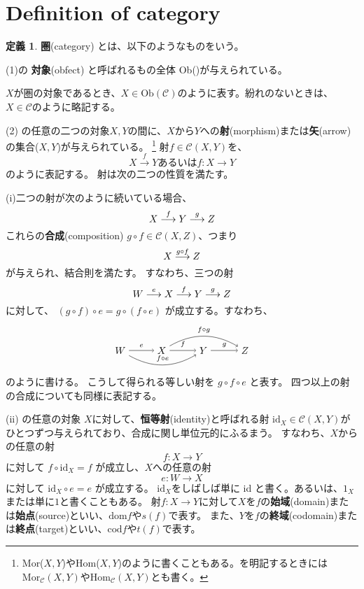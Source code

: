 \documentclass[dvipdfmx]{jsbook}
\theoremstyle{definition}
\newtheorem{dfn}{定義}[section]
\begin{document}
\section{Definition of category}
\begin{dfn}
\textbf{圏}(category) \category とは、以下のようなものをいう。
\end{dfn}
(1)\category の \textbf{対象}(obfect) と呼ばれるもの全体 Ob(\category)が与えられている。

$X$が圏\category の対象であるとき、$X \in \mathrm{Ob}(\mathscr{C})$のように表す。紛れのないときは、$X \in \mathscr{C}$のように略記する。

(2) \category の任意の二つの対象$X,Y$の間に、$X$から$Y$への\textbf{射}(morphism)または\textbf{矢}(arrow)の集合\category ($X,Y$)が与えられている。
\footnote{Mor($X,Y$)やHom($X,Y$)のように書くこともある。\category を明記するときには $\mathrm{Mor}_{\mathscr{C}} (X,Y) や  \mathrm{Hom}_{\mathscr{C}} (X,Y)$とも書く。}
射$f \in \mathscr{C}(X,Y)$を、
\[
X \overset{f}{\longrightarrow} Y
あるいは
f \colon X \longrightarrow Y
\]
のように表記する。
射は次の二つの性質を満たす。

(i)二つの射が次のように続いている場合、
\[
X \overset{f}{\longrightarrow} Y \overset{g}{\longrightarrow} Z
\]
これらの\textbf{合成}(composition)
$g \circ f \in \mathscr{C} (X,Z)$、つまり
\[ X \overset{g \circ f}{\longrightarrow} Z \]
が与えられ、結合則を満たす。
すなわち、三つの射
\[
W \overset{e}{\longrightarrow} X \overset{f}{\longrightarrow} Y \overset{g}{\longrightarrow} Z
\]
に対して、
$(g \circ f) \circ e = g \circ (f \circ e)$
が成立する。すなわち、
\[
\begin{tikzpicture}[auto]
\node (w) at (0,0) {$W$}; \node (x) at (1.5,0) {$X$};
\node (y) at (3.0,0) {$Y$}; \node (z) at (4.5,0) {$Z$};
\draw[-to] (w) to node {$\scriptstyle e$} (x);
\draw[-to] (x) to node {$\scriptstyle f$} (y);
\draw[-to] (y) to node {$\scriptstyle g$} (z);
\draw[-to,bend left] (x) to node {$\scriptstyle f \circ g$} (z);
\draw[-to,bend right] (w) to node {$\scriptstyle f \circ e $} (y);
\end{tikzpicture}
\]
のように書ける。
こうして得られる等しい射を
$g \circ f \circ e$
と表す。
四つ以上の射の合成についても同様に表記する。

(ii) \category の任意の対象 $X$に対して、\textbf{恒等射}(identity)と呼ばれる射 $\mathrm{id}_X \in \mathscr{C} (X,Y)$がひとつずつ与えられており、合成に関し単位元的にふるまう。
すなわち、$X$からの任意の射
\[f \colon X \longrightarrow Y \]
に対して
$f \circ \mathrm{id}_{X} = f$
が成立し、$X$への任意の射
\[
e \colon W \longrightarrow X
\]
に対して
$\mathrm{id}_X \circ e = e$
が成立する。
$\mathrm{id}_X$をしばしば単に id と書く。あるいは、$1_X$ または単に$1$と書くこともある。
射$f \colon X \longrightarrow Y$に対して$X$を$f$の\textbf{始域}(domain)または\textbf{始点}(source)といい、$\mathrm{dom}f$や$s(f)$で表す。
また、$Y$を$f$の\textbf{終域}(codomain)または\textbf{終点}(target)といい、$\mathrm{cod}f$や$t(f)$で表す。
\end{document}
